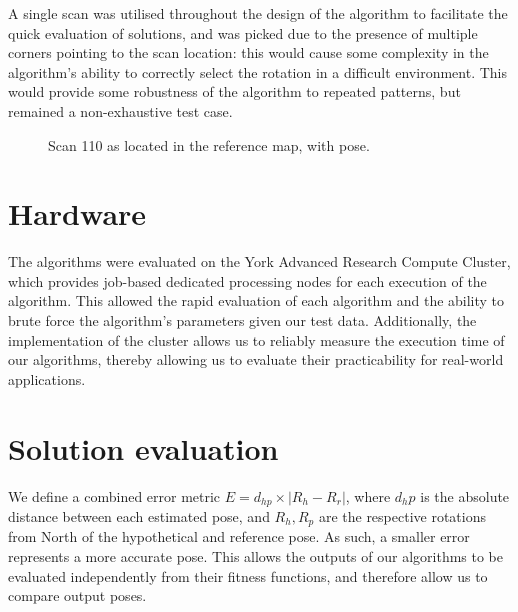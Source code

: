 \documentclass[authoryearcitations]{UoYCSproject}
\begin{document}
A single scan was utilised throughout the design of the algorithm to facilitate the quick evaluation of solutions, and was picked due to the presence of multiple corners pointing to the scan location: this would cause some complexity in the algorithm's ability to correctly select the rotation in a difficult environment. This would provide some robustness of the algorithm to repeated patterns, but remained a non-exhaustive test case. \newline

\begin{figure}
\begin{subfigure}[b]{0.3\textwidth}

\end{subfigure}
\caption{Scan 110 as located in the reference map, with pose.}
\label{fig:scan110}
\end{figure}

\section{Hardware}
The algorithms were evaluated on the York Advanced Research Compute Cluster, which provides job-based dedicated processing nodes for each execution of the algorithm. This allowed the rapid evaluation of each algorithm and the ability to brute force the algorithm's parameters given our test data. Additionally, the implementation of the cluster allows us to reliably measure the execution time of our algorithms, thereby allowing us to evaluate their practicability for real-world applications.

\section{Solution evaluation}
\label{sec:sol_eval}
We define a combined error metric $E=d_{hp}\times |R_h-R_r|$, where $d_hp$ is the absolute distance between each estimated pose, and $R_h, R_p$ are the respective rotations from North of the hypothetical and reference pose. As such, a smaller error represents a more accurate pose. This allows the outputs of our algorithms to be evaluated independently from their fitness functions, and therefore allow us to compare output poses. \newline
\end{document}
